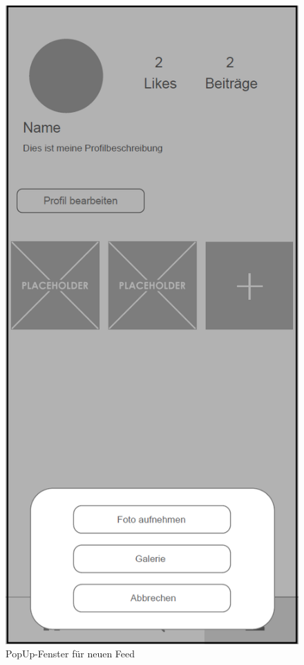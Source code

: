 \begin{figure}[H]
    \centering
    \begin{minipage}{.5\textwidth}
      \centering
      \includegraphics[width=.6\linewidth]{images/PopUp_Photo_MockUp.png}
      \caption{PopUp-Fenster für neuen Feed}
      \label{fig:popup_new_feed}
    \end{minipage}%
    \begin{minipage}{.5\textwidth}
      \centering

\end{minipage}
\end{figure}
